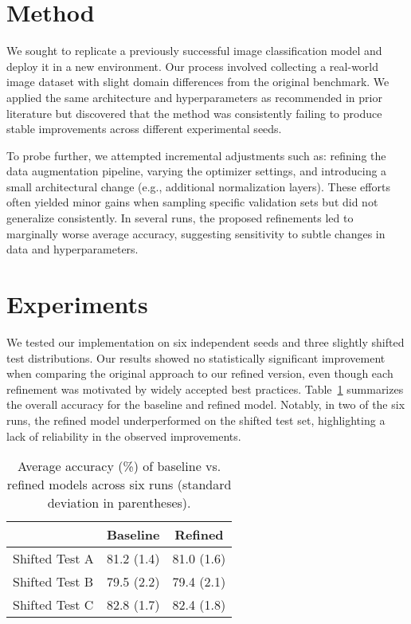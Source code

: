 \documentclass{article}
\begin{document}
\section{Method}
We sought to replicate a previously successful image classification model and deploy it in a new environment. Our process involved collecting a real-world image dataset with slight domain differences from the original benchmark. We applied the same architecture and hyperparameters as recommended in prior literature \cite{brown2020} but discovered that the method was consistently failing to produce stable improvements across different experimental seeds.

To probe further, we attempted incremental adjustments such as: refining the data augmentation pipeline, varying the optimizer settings, and introducing a small architectural change (e.g., additional normalization layers). These efforts often yielded minor gains when sampling specific validation sets but did not generalize consistently. In several runs, the proposed refinements led to marginally worse average accuracy, suggesting sensitivity to subtle changes in data and hyperparameters.

\section{Experiments}
We tested our implementation on six independent seeds and three slightly shifted test distributions. Our results showed no statistically significant improvement when comparing the original approach to our refined version, even though each refinement was motivated by widely accepted best practices. Table~\ref{tab:main_results} summarizes the overall accuracy for the baseline and refined model. Notably, in two of the six runs, the refined model underperformed on the shifted test set, highlighting a lack of reliability in the observed improvements.

\begin{table}[!h]
\centering
\caption{Average accuracy (\%) of baseline vs. refined models across six runs (standard deviation in parentheses).}
\label{tab:main_results}
\begin{tabular}{lcc}
\hline
 & Baseline & Refined \\
\hline
Shifted Test A & 81.2 (1.4) & 81.0 (1.6) \\
Shifted Test B & 79.5 (2.2) & 79.4 (2.1) \\
Shifted Test C & 82.8 (1.7) & 82.4 (1.8) \\
\hline
\end{tabular}
\end{table}
\end{document}
